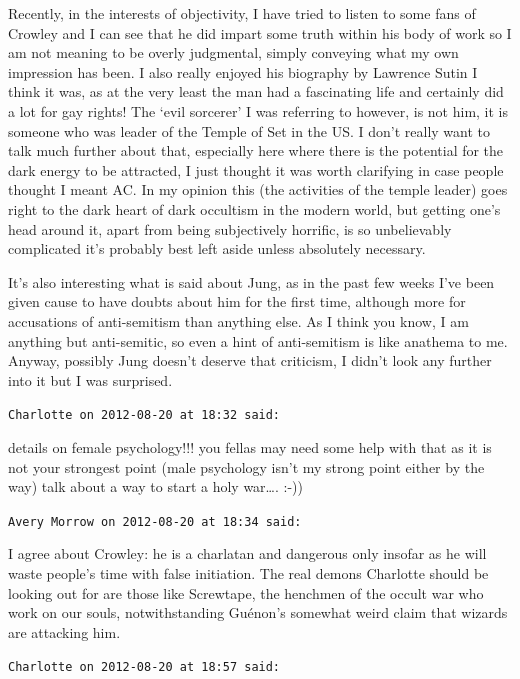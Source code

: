 \begin{footnotesize}
\begin{sffamily}
Recently, in the interests of objectivity, I have tried to listen to some fans of Crowley and I can see that he did impart some truth within his body of work so I am not meaning to be overly judgmental, simply conveying what my own impression has been. I also really enjoyed his biography by Lawrence Sutin I think it was, as at the very least the man had a fascinating life and certainly did a lot for gay rights! The `evil sorcerer' I was referring to however, is not him, it is someone who was leader of the Temple of Set in the US. I don't really want to talk much further about that, especially here where there is the potential for the dark energy to be attracted, I just thought it was worth clarifying in case people thought I meant AC. In my opinion this (the activities of the temple leader) goes right to the dark heart of dark occultism in the modern world, but getting one's head around it, apart from being subjectively horrific, is so unbelievably complicated it's probably best left aside unless absolutely necessary.

It's also interesting what is said about Jung, as in the past few weeks I've been given cause to have doubts about him for the first time, although more for accusations of anti-semitism than anything else. As I think you know, I am anything but anti-semitic, so even a hint of anti-semitism is like anathema to me. Anyway, possibly Jung doesn't deserve that criticism, I didn't look any further into it but I was surprised.


\hfill

\texttt{Charlotte on 2012-08-20 at 18:32 said: }

details on female psychology!!! you fellas may need some help with that as it is not your strongest point (male psychology isn't my strong point either by the way) talk about a way to start a holy war…. :-))


\hfill

\texttt{Avery Morrow on 2012-08-20 at 18:34 said: }

I agree about Crowley: he is a charlatan and dangerous only insofar as he will waste people's time with false initiation. The real demons Charlotte should be looking out for are those like Screwtape, the henchmen of the occult war who work on our souls, notwithstanding Guénon's somewhat weird claim that wizards are attacking him.


\hfill

\texttt{Charlotte on 2012-08-20 at 18:57 said: }


\end{sffamily}
\end{footnotesize}

